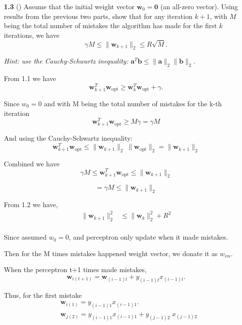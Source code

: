 \textbf{1.3} () Assume that the initial weight vector $\mathbf{w}_{0}=\mathbf{0}$ (an all-zero vector). Using results from the previous two parts, show that for any iteration $k+1$, with $M$ being the total number of mistakes the algorithm has made for the first $k$ iterations, we have
\begin{equation}
    \gamma M \leq \|\mathbf{w}_{k+1}\|_2 \leq R\sqrt{M}.
\end{equation}

\emph{Hint: use the Cauchy-Schwartz inequality: $\mathbf{a}^T\mathbf{b}\leq \|\mathbf{a}\|_2 \|\mathbf{b}\|_2$.}\\


From 1.1 we have
\[
\mathbf{w}_{k+1}^T \mathbf{w}_{\text{opt}}
\ge \mathbf{w}_k^T \mathbf{w}_{\text{opt}} + \gamma.
\]

Since $w_0 = 0$ and with M being the total number of mistakes for the k-th iteration 
\[
\mathbf{w}_{k+1}^T \mathbf{w}_{\text{opt}}
\ge M \gamma = \gamma M 
\]

And using the Cauchy-Schwartz inequality:
\[
\mathbf{w}_{k+1}^T \mathbf{w}_{\text{opt}}
\le \|\mathbf{w}_{k+1}\|_2 \; \|\mathbf{w}_{\text{opt}}\|_2 
= \|\mathbf{w}_{k+1}\|_2
\]

Combined we have
\[
\gamma M 
\le \mathbf{w}_{k+1}^T \mathbf{w}_{\text{opt}}
\le \|\mathbf{w}_{k+1}\|_2 
\]

\[
= \gamma M \le \|\mathbf{w}_{k+1}\|_2 
\]

From 1.2 we have,
\begin{align*}
\| \mathbf{w}_{k+1} \|_2^2
&\leq \| \mathbf{w}_k \|_2^2+{R^2}\\
\end{align*}

Since assumed $w_0 = 0$, and perceptron only update when it made mistakes.

Then for the M times mistakes happened weight vector, we donate it as $w_{im}$.

When the perceptron t+1 times made mistakes,
\[
\mathbf{w}_{i(t+1)} = \mathbf{w}_{(i-1)t} + y_{(i-1)t} x_{(i-1)t}.
\]

Thus, for the first mistake
\begin{align*}
&\mathbf{w}_{i(1)} = y_{(i-1)1} x_{(i-1)1}.\\
&\mathbf{w}_{j(2)} = y_{(i-1)1} x_{(i-1)1} +y_{(j-1)2} \; x_{(j-1)2}
\end{align*}

